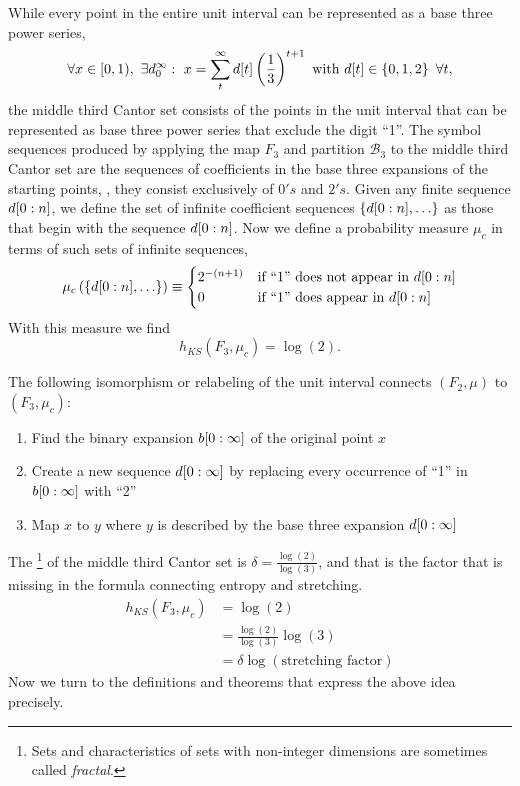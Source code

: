 While every point in the entire unit interval can be represented as a
base three power series, \ie
\begin{equation*}
  \forall x \in [0,1),~ \exists d_0^\infty :~x  = \sum_t^\infty
  {d}{[t]} \left(\frac{1}{3}\right)^{t+1} \text{ with } {d}{[t]} \in
  \left\{ 0,1,2 \right\} ~ \forall t,
\end{equation*}
the middle third Cantor set consists of the points in the unit
interval that can be represented as base three power series that
exclude the digit ``1''.  The symbol sequences produced by applying
the map $F_3$ and partition $\mathcal{B}_3$ to the middle third Cantor
set are the sequences of coefficients in the base three expansions of
the starting points, \ie, they consist exclusively of $0's$ and $2's$.
Given any finite sequence $d[0:n]$, we define the set of infinite
coefficient sequences $\left\{d[0:n]
,\ldots \right\}$ as those that
begin with the sequence $d[0:n]$.  Now we define a probability measure
$\mu_c$ in terms of such sets of infinite sequences,
\begin{equation}
  \label{eq:muC}
  \mu_c\left( \left\{ d[0:n],\ldots \right\} \right) \equiv 
  \begin{cases}
    2^{-(n+1)} & \text{if ``1'' does not appear in } d[0:n]\\
    0 & \text{if ``1'' does appear in } d[0:n]
  \end{cases}
\end{equation}
With this measure we find
\begin{equation*}
  h_{KS}(F_3,\mu_c) = \log(2).
\end{equation*}

The following isomorphism or relabeling of the unit interval connects
$(F_2,\mu)$ to $(F_3,\mu_c)$:
\begin{enumerate}
\item Find the binary expansion $b[0:\infty]$ of the original
  point $x$
\item Create a new sequence $d[0:\infty]$ by replacing every
  occurrence of ``1'' in  $b[0:\infty]$ with ``2''
\item Map $x$ to $y$ where $y$ is described by the base three
  expansion $d[0:\infty]$
\end{enumerate}

The \footnote{Sets and characteristics of
  sets with non-integer dimensions are sometimes called
  \emph{fractal}.} of the middle third Cantor set is
$\delta = \frac{\log(2)}{\log(3)}$, and that is the factor that is
missing in the formula connecting entropy and stretching.
\begin{align}
  h_{KS}(F_3,\mu_c) &= \log(2) \nonumber \\
  &= \frac{\log(2)}{\log(3)} \log(3) \nonumber \\
  \label{eq:CantorCorrect}
  &= \delta \log(\text{stretching factor})
\end{align}
Now we turn to the definitions and theorems that express the above
idea precisely.

